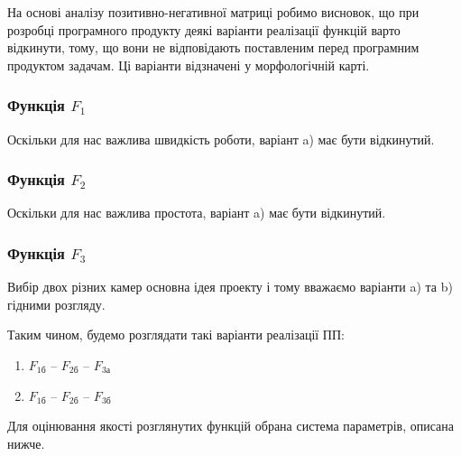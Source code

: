 На основі аналізу позитивно-негативної матриці робимо висновок, що при розробці програмного продукту деякі варіанти реалізації функцій варто відкинути, тому, що вони не відповідають поставленим перед програмним продуктом задачам. Ці варіанти відзначені у морфологічній карті.
\subsubsection{Функція $F_1$}
Оскільки для нас важлива швидкість роботи, варіант a) має бути відкинутий.
\subsubsection{Функція $F_2$}
\label{subsub:economics_f2}
Оскільки для нас важлива простота, варіант a) має бути відкинутий.
\subsubsection{Функція $F_3$}
Вибір двох різних камер основна ідея проекту і тому вважаємо варіанти a) та b) гідними розгляду.

Таким чином, будемо розглядати такі варіанти реалізації ПП:
\newcommand{\econf}[2]{F_{#1\text{#2} } }
\begin{enumerate}
	\item $\econf{1}{б}$ – $\econf{2}{б}$ – $\econf{3}{а}$
	\item $\econf{1}{б}$ – $\econf{2}{б}$ – $\econf{3}{б}$
\end{enumerate}
Для оцінювання якості розглянутих функцій обрана система параметрів, описана нижче.